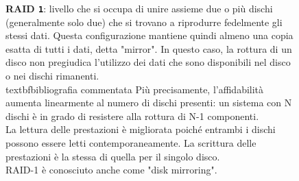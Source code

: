 \begin{itemize}
\begin{figure}[htbp]
\item 
\textbf{RAID \verb"1"}: livello che si occupa di unire assieme due o pi\`{u} dischi (generalmente solo due) che si trovano a riprodurre fedelmente gli stessi dati. Questa configurazione mantiene quindi almeno una copia esatta di tutti i dati, detta "mirror". In questo caso, la rottura di un disco non pregiudica l'utilizzo dei dati che sono disponibili nel disco o nei dischi rimanenti.\\textbf{bibliografia commentata} Pi\`{u} precisamente, l'affidabilit\`{a} aumenta linearmente al numero di dischi presenti: un sistema con N dischi \`{e} in grado di resistere alla rottura di N-1 componenti.\\ La lettura delle prestazioni \`{e} migliorata poich\'{e} entrambi i dischi possono essere letti contemporaneamente. La scrittura delle prestazioni \`{e} la stessa di quella per il singolo disco.\cite{etichetta9} \\RAID-1 \`{e} conosciuto anche come "disk mirroring".\\


\end{figure}
\end{itemize}
